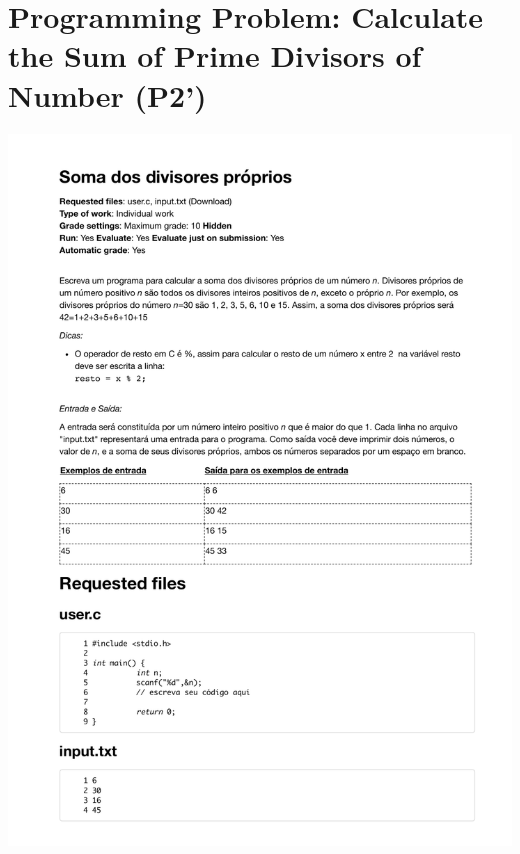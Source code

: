 \section{Programming Problem: Calculate the Sum of Prime Divisors of Number (P2')}
\label{annex:pilot-study-p2}
\includegraphics[page=1,width=1\textwidth]{images/annex/pilot-study-p2.pdf}

\newpage

